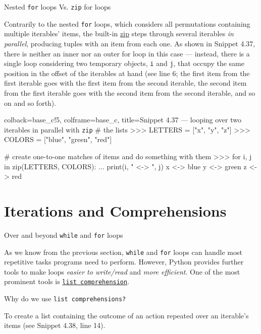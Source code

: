 \documentclass[a4paper,11pt]{book}
\numberwithin{figure}{chapter}
\numberwithin{table}{chapter}
\newcommand{\question}[1]{%
    \begin{tcolorbox}[colback=comp_c!10,colframe=comp_c,sidebyside align=top,width=\linewidth,before skip=1ex]
        #1
    \end{tcolorbox}
    \switchcolumn%
}
\newcommand{\note}[1]{%
    \begin{tcolorbox}[colback=white!0,colframe=white!10,width=\linewidth,before skip=1ex]
        #1
    \end{tcolorbox}
}
\begin{document}
\begin{paracol}{2}
	\question{\raggedright Nested \texttt{for} loops Vs. \texttt{zip} for loops}
	\note{Contrarily to the nested \texttt{for} loops, which considers all permutations containing multiple iterables' items, the built-in \href{https://docs.python.org/3/library/functions.html\#zip}{zip} steps through several iterables \emph{in parallel}, producing tuples with an item from each one. As shown in Snippet 4.37, there is neither an inner nor an outer for loop in this case --- instead, there is a single loop considering two temporary objects, \texttt{i} and \texttt{j}, that occupy the same position in the offset of the iterables at hand (see line 6; the first item from the first iterable goes with the first item from the second iterable, the second item from the first iterable goes with the second item from the second iterable, and so on and so forth).}
\end{paracol}

\begin{pythoncode}[linenos=true,]{colback=base_c!5, colframe=base_c, title=\sffamily Snippet 4.37 --- looping over two iterables in parallel with \texttt{zip} }
# the lists
>>> LETTERS = ["x", "y", "z"]
>>> COLORS = ["blue", "green", "red"]

# create one-to-one matches of items and do something with them
>>> for i, j in zip(LETTERS, COLORS):
...     print(i, " <-> ", j)
x  <->  blue
y  <->  green
z  <->  red
\end{pythoncode}

\section{Iterations and Comprehensions}
\label{sec:iterations_and_comprhensions}

\begin{paracol}{2}
	\question{\raggedright Over and beyond \texttt{while} and \texttt{for} loops}
	\note{As we know from the previous section, \texttt{while} and \texttt{for} loops can handle most repetitive tasks programs need to perform. However, Python provides further tools to make loops \emph{easier to write/read} and \emph{more efficient}. One of the most prominent tools is \href{https://docs.python.org/3/tutorial/datastructures.html}{\texttt{list comprehension}}.}
\end{paracol}

\begin{paracol}{2}
	\question{\raggedright Why do we use \texttt{list comprehensions?}}
	\note{To create a list containing the outcome of an action repeated over an iterable's items (see Snippet 4.38, line 14).}
\end{paracol}
\end{document}

